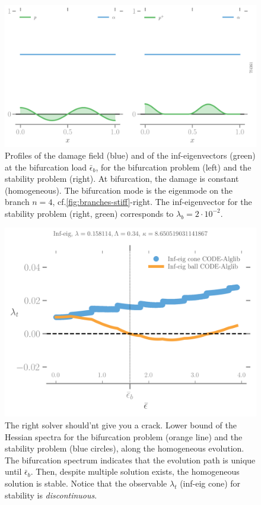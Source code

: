 \begin{figure}[htbp]
    \centering
    \includegraphics*[width=.95\textwidth]{../images/profiles-bif-stab-7f4361886184f3c6791fe16bf4f4b3f2.pdf}
    
    \caption{Profiles of the damage field (blue) and of the inf-eigenvectors (green)  at the bifurcation load $\bar \epsilon_b$, for the bifurcation problem (left) and the stability problem (right).
    At bifurcation, the damage is constant (homogeneous). 
    The bifurcation mode is the eigenmode on the branch $n=4$, cf.\ref{fig:branches-stiff}-right. 
    The inf-eigenvector for the stability problem (right, green) corresponds to $\lambda_b=2\cdot 10^{-2}$.}
      \label{fig:irreversibility-profiles}
\end{figure}

\begin{figure}[htbp]
    \centering
    \includegraphics*[width=.7\textwidth]{../images/irreversibility_inf_eig.png}
    \caption{The right solver should'nt give you a crack. Lower bound of the Hessian spectra for the bifurcation problem  (orange line) and the stability problem (blue circles), along the homogeneous evolution. The bifurcation spectrum indicates  that the evolution path is unique until $\bar \epsilon_b$. Then, despite multiple solution exists, the homogeneous solution is stable. Notice that the observable $\lambda_t$ (inf-eig cone) for stability is \emph{discontinuous}.
    }
    \label{fig:shouldnt}
\end{figure}
